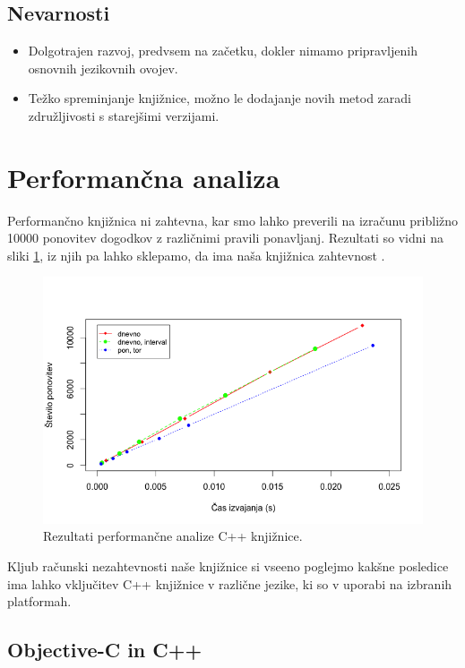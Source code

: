 \subsection{Nevarnosti}

\begin{itemize}
  \item Dolgotrajen razvoj, predvsem na začetku, dokler nimamo pripravljenih osnovnih jezikovnih ovojev.
  \item Težko spreminjanje knjižnice, možno le dodajanje novih metod zaradi združljivosti s starejšimi verzijami.
\end{itemize}

\section{Performančna analiza}

Performančno knjižnica ni zahtevna, kar smo lahko preverili na izračunu približno 10000 ponovitev dogodkov z različnimi pravili ponavljanj. Rezultati so vidni na sliki \ref{fig:performance}, iz njih pa lahko sklepamo, da ima naša knjižnica zahtevnost .

\begin{figure}
 \includegraphics[width=\linewidth]{performance}
 \caption{Rezultati performančne analize C++ knjižnice.}
 \label{fig:performance}
\end{figure}

Kljub računski nezahtevnosti naše knjižnice si vseeno poglejmo kakšne posledice ima lahko vključitev C++ knjižnice v različne jezike, ki so v uporabi na izbranih platformah.

\subsection{Objective-C in C++}

